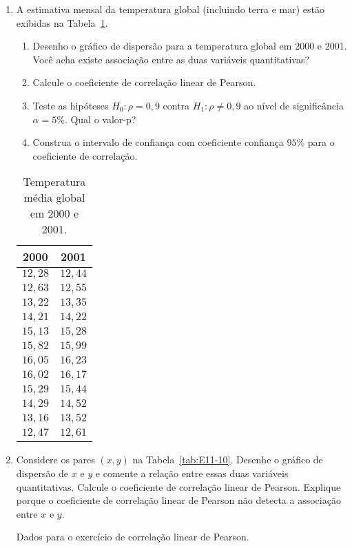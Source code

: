 \documentclass[8pt, a4paper]{article}
\begin{document}
\begin{enumerate}
	\item A estimativa mensal da temperatura global (incluindo terra e mar) estão exibidas na Tabela~\ref{tab:global_temp}.
	\begin{enumerate}
		\item Desenho o gráfico de dispersão para a temperatura global em 2000 e 2001. Você acha existe associação entre as duas variáveis quantitativas?
		\item Calcule o coeficiente de correlação linear de Pearson.
		\item Teste as hipóteses $H_0: \rho = 0,9$ contra $H_1: \rho \neq 0,9$ ao nível de significância $\alpha=5\%$. Qual o valor-p?
		\item Construa o intervalo de confiança com coeficiente confiança $95\%$ para o coeficiente de correlação. 
	\end{enumerate}
	\begin{table}[htbp]
		\centering
		\caption{Temperatura média global em 2000 e 2001.}
		\label{tab:global_temp}
		\begin{tabular}{cc}
			\toprule
			\textbf{2000} & \textbf{2001} \\ 
			\midrule
			$12,28$ & $12,44$ \\ 
			$12,63$ & $12,55$ \\ 
			$13,22$ & $13,35$ \\ 
			$14,21$ & $14,22$ \\ 
			$15,13$ & $15,28$ \\ 
			$15,82$ & $15,99$ \\ 
			$16,05$ & $16,23$ \\ 
			$16,02$ & $16,17$ \\ 
			$15,29$ & $15,44$ \\ 
			$14,29$ & $14,52$ \\ 
			$13,16$ & $13,52$ \\ 
			$12,47$ & $12,61$ \\ 
			\bottomrule
		\end{tabular}
	\end{table}
	\item Considere os pares $(x,y)$ na Tabela~\ref{tab:E11-10}. Desenhe o gráfico de dispersão de $x$ e $y$ e comente a relação entre essas duas variáveis quantitativas. Calcule o coeficiente de correlação linear de Pearson. Explique porque o coeficiente de correlação linear de Pearson não detecta a associação entre $x$ e $y$.
	\begin{table}[htbp]
		\centering
		\caption{Dados para o exercício de correlação linear de Pearson.}

\end{table}
\end{enumerate}
\end{document}
